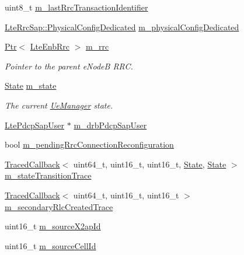 \begin{DoxyCompactItemize}
\item 
uint8\+\_\+t \hyperlink{classns3_1_1UeManager_aa8546edd90163c658d2ce9cc6c8da657}{m\+\_\+last\+Rrc\+Transaction\+Identifier}
\item 
\hyperlink{structns3_1_1LteRrcSap_1_1PhysicalConfigDedicated}{Lte\+Rrc\+Sap\+::\+Physical\+Config\+Dedicated} \hyperlink{classns3_1_1UeManager_a5fca85495adcd0de6823e738094aacaf}{m\+\_\+physical\+Config\+Dedicated}
\item 
\hyperlink{classns3_1_1Ptr}{Ptr}$<$ \hyperlink{classns3_1_1LteEnbRrc}{Lte\+Enb\+Rrc} $>$ \hyperlink{classns3_1_1UeManager_ab4405e9f354c66e7c1a4c95832290f5b}{m\+\_\+rrc}
\begin{DoxyCompactList}\small\item\em Pointer to the parent e\+NodeB R\+RC. \end{DoxyCompactList}\item 
\hyperlink{classns3_1_1UeManager_a2f4085fdd18d7125c27da44a5b8b6808}{State} \hyperlink{classns3_1_1UeManager_aaed4b2490297cb912e743084f1a27b08}{m\+\_\+state}
\begin{DoxyCompactList}\small\item\em The current \hyperlink{classns3_1_1UeManager}{Ue\+Manager} state. \end{DoxyCompactList}\item 
\hyperlink{classns3_1_1LtePdcpSapUser}{Lte\+Pdcp\+Sap\+User} $\ast$ \hyperlink{classns3_1_1UeManager_af261f8dc60848f41e18c9fba89d9903d}{m\+\_\+drb\+Pdcp\+Sap\+User}
\item 
bool \hyperlink{classns3_1_1UeManager_ac1e5bf47aad07288d2676bb09e63e215}{m\+\_\+pending\+Rrc\+Connection\+Reconfiguration}
\item 
\hyperlink{classns3_1_1TracedCallback}{Traced\+Callback}$<$ uint64\+\_\+t, uint16\+\_\+t, uint16\+\_\+t, \hyperlink{classns3_1_1UeManager_a2f4085fdd18d7125c27da44a5b8b6808}{State}, \hyperlink{classns3_1_1UeManager_a2f4085fdd18d7125c27da44a5b8b6808}{State} $>$ \hyperlink{classns3_1_1UeManager_ac17d478044a6111ca71b05d8b3950bf7}{m\+\_\+state\+Transition\+Trace}
\item 
\hyperlink{classns3_1_1TracedCallback}{Traced\+Callback}$<$ uint64\+\_\+t, uint16\+\_\+t, uint16\+\_\+t $>$ \hyperlink{classns3_1_1UeManager_a1fd26ae2275ed93d13fefd27d1b89307}{m\+\_\+secondary\+Rlc\+Created\+Trace}
\item 
uint16\+\_\+t \hyperlink{classns3_1_1UeManager_aec435692a673cd55353a2bb258d5f487}{m\+\_\+source\+X2ap\+Id}
\item 
uint16\+\_\+t \hyperlink{classns3_1_1UeManager_add9ed1d405182617c513205fab32d470}{m\+\_\+source\+Cell\+Id}

\end{DoxyCompactItemize}
